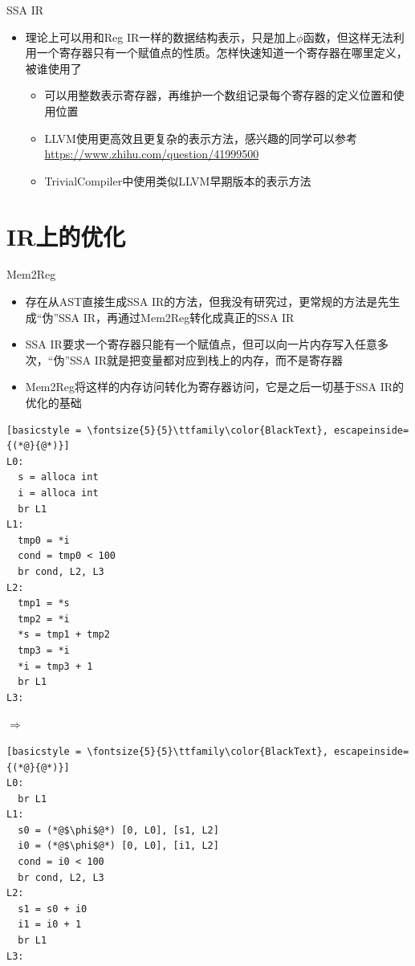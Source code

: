 \documentclass{beamer}
\begin{document}
\begin{frame}{SSA IR}
\begin{itemize}
  \item 理论上可以用和Reg IR一样的数据结构表示，只是加上$\phi$函数，但这样无法利用一个寄存器只有一个赋值点的性质。怎样快速知道一个寄存器在哪里定义，被谁使用了
  \begin{itemize}
    \item 可以用整数表示寄存器，再维护一个数组记录每个寄存器的定义位置和使用位置
    \item LLVM使用更高效且更复杂的表示方法，感兴趣的同学可以参考\href{https://www.zhihu.com/question/41999500}{https://www.zhihu.com/question/41999500}
    \item TrivialCompiler中使用类似LLVM早期版本的表示方法
  \end{itemize}
\end{itemize}
\end{frame}

\section{IR上的优化}

\begin{frame}[fragile]{Mem2Reg}
\begin{itemize}
  \item 存在从AST直接生成SSA IR的方法，但我没有研究过，更常规的方法是先生成``伪''SSA IR，再通过Mem2Reg转化成真正的SSA IR
  \item SSA IR要求一个寄存器只能有一个赋值点，但可以向一片内存写入任意多次，``伪''SSA IR就是把变量都对应到栈上的内存，而不是寄存器
  \item Mem2Reg将这样的内存访问转化为寄存器访问，它是之后一切基于SSA IR的优化的基础
\end{itemize}
\begin{center}
\begin{minipage}{0.30\textwidth}
  \begin{lstlisting}[basicstyle = \fontsize{5}{5}\ttfamily\color{BlackText}, escapeinside={(*@}{@*)}]
L0:
  s = alloca int
  i = alloca int
  br L1
L1:
  tmp0 = *i
  cond = tmp0 < 100
  br cond, L2, L3
L2:
  tmp1 = *s
  tmp2 = *i
  *s = tmp1 + tmp2
  tmp3 = *i
  *i = tmp3 + 1
  br L1
L3:
  \end{lstlisting}
\end{minipage}\hspace{0.5cm}
$\Rightarrow$
\hspace{0.4cm}
\begin{minipage}{0.30\textwidth}
  \begin{lstlisting}[basicstyle = \fontsize{5}{5}\ttfamily\color{BlackText}, escapeinside={(*@}{@*)}]
L0:
  br L1
L1:
  s0 = (*@$\phi$@*) [0, L0], [s1, L2]
  i0 = (*@$\phi$@*) [0, L0], [i1, L2]
  cond = i0 < 100
  br cond, L2, L3
L2:
  s1 = s0 + i0
  i1 = i0 + 1
  br L1
L3:
  \end{lstlisting}
\end{minipage}
\end{center}
\end{frame}
\end{document}
